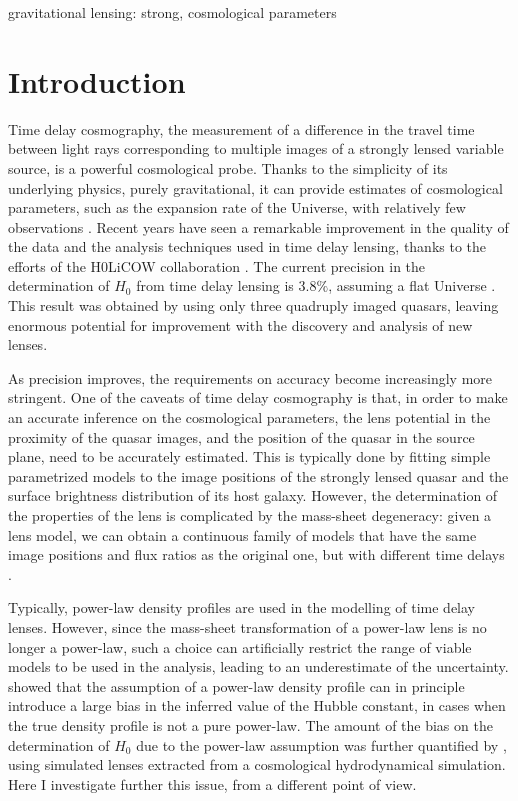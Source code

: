 \documentclass[usenatbib]{mnras}
\begin{document}
\begin{keywords}
   gravitational lensing: strong, cosmological parameters
\end{keywords}

\section{Introduction}\label{sect:intro}

Time delay cosmography, the measurement of a difference in the travel time between light rays corresponding to multiple images of a strongly lensed variable source, is a powerful cosmological probe. Thanks to the simplicity of its underlying physics, purely gravitational, it can provide estimates of cosmological parameters, such as the expansion rate of the Universe, with relatively few observations \citep[see][for a review]{T+M16}.
Recent years have seen a remarkable improvement in the quality of the data and the analysis techniques used in time delay lensing, thanks to the efforts of the H0LiCOW collaboration \citep{Suy++17}.
The current precision in the determination of $H_0$ from time delay lensing is $3.8\%$, assuming a flat Universe \citep{Bon++17}.
This result was obtained by using only three quadruply imaged quasars, leaving enormous potential for improvement with the discovery and analysis of new lenses.

As precision improves, the requirements on accuracy become increasingly more stringent.
One of the caveats of time delay cosmography is that, in order to make an accurate inference on the cosmological parameters, the lens potential in the proximity of the quasar images, and the position of the quasar in the source plane, need to be accurately estimated.
This is typically done by fitting simple parametrized models to the image positions of the strongly lensed quasar and the surface brightness distribution of its host galaxy.
However, the determination of the properties of the lens is complicated by the mass-sheet degeneracy: given a lens model, we can obtain a continuous family of models that have the same image positions and flux ratios as the original one, but with different time delays \citep{FGS85}.

Typically, power-law density profiles are used in the modelling of time delay lenses.
However, since the mass-sheet transformation of a power-law lens is no longer a power-law, such a choice can artificially restrict the range of viable models to be used in the analysis, leading to an underestimate of the uncertainty.
\citet{S+S13} showed that the assumption of a power-law density profile can in principle introduce a large bias in the inferred value of the Hubble constant, in cases when the true density profile is not a pure power-law.
The amount of the bias on the determination of $H_0$ due to the power-law assumption was further quantified by \citet{Xu++16}, using simulated lenses extracted from a cosmological hydrodynamical simulation.
Here I investigate further this issue, from a different point of view.
\end{document}
